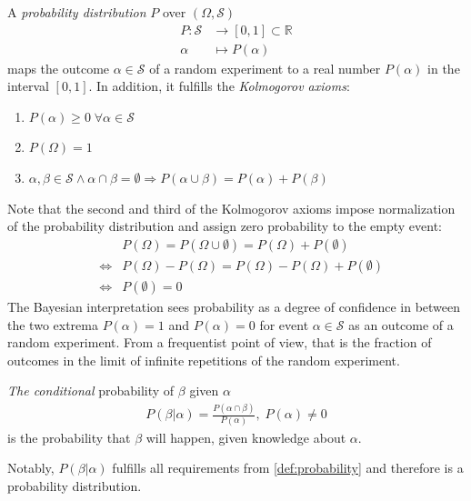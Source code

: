 \begin{mydef}
    \label{def:probability}
    A \emph{probability distribution} $P$ over $(\Omega, \mathcal{S})$
    \begin{align}
        \label{eq:probability-mapping}
        P: \mathcal{S} &\to [0,1] \subset \mathbb{R} \\ \nonumber
        \alpha &\mapsto P(\alpha)
    \end{align}
    maps the outcome $\alpha \in \mathcal{S}$ of a random experiment to a real number $P(\alpha)$ in
    the interval $[0,1]$. In addition, it fulfills the \emph{Kolmogorov axioms}:
    \begin{enumerate}
          \item $P(\alpha) \ge 0 \; \forall \alpha \in \mathcal{S}$
          \item $P(\Omega) = 1$ \label{itm:probability-trivial}
          \item $\alpha, \beta \in \mathcal{S} \wedge \alpha \cap \beta = \emptyset \Rightarrow
        P(\alpha \cup \beta) = P(\alpha) + P(\beta)$ \label{itm:probability-union}
    \end{enumerate}
\end{mydef}
Note that the second and third of the Kolmogorov axioms impose normalization of the probability
distribution and assign zero probability to the empty event:
\begin{align}
    \label{eq:probability-no-empty-event}
    &&P(\Omega) = P(\Omega \cup \emptyset) = P(\Omega) + P(\emptyset) \\
    &\Leftrightarrow &P(\Omega) - P(\Omega) = P(\Omega) - P(\Omega) + P(\emptyset) \\
    &\Leftrightarrow &P(\emptyset) = 0
\end{align}
The Bayesian interpretation sees probability as a degree of confidence in between the two extrema
$P(\alpha)=1$ and $P(\alpha)=0$ for event $\alpha \in \mathcal{S}$ as an outcome of a random
experiment. From a frequentist point of view, that is the fraction of outcomes in the limit of
infinite repetitions of the random experiment.

\begin{mydef}
    \label{def:conditional-probability}
    \emph{The conditional} probability of $\beta$ given $\alpha$
    \begin{align}
        \label{eq:condititonal-probability}
        P(\beta | \alpha) = \frac{P(\alpha \cap \beta)}{P(\alpha)}, \; P(\alpha) \ne 0
    \end{align}
    is the probability that $\beta$ will happen, given knowledge about
    $\alpha$.
\end{mydef}
Notably, $P(\beta | \alpha)$ fulfills all requirements from \cref{def:probability} and therefore is
a probability distribution.

